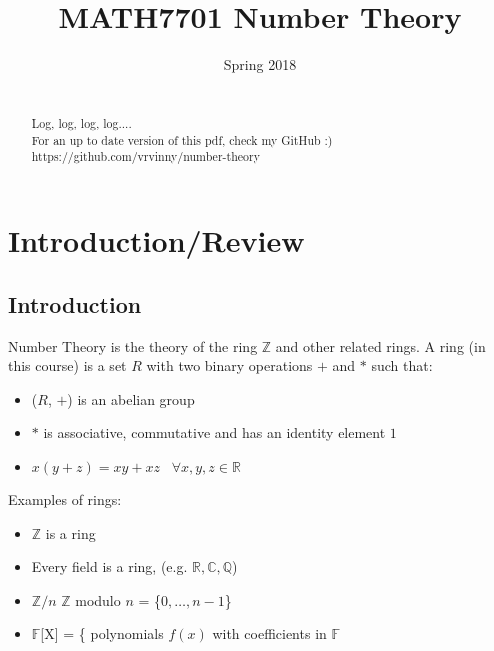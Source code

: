 \documentclass[11pt]{article}
\begin{document}
\newtheorem{theorem}{Theorem}[section]
\newtheorem{definition}[theorem]{Definition}
\newtheorem{proposition}[theorem]{Proposition}
\newtheorem{corollary}[theorem]{Corollary}
\newtheorem{lemma}[theorem]{Lemma}

\title{MATH7701 Number Theory}
	\author{ }
	\date{Spring 2018}
	\maketitle


\newpage
	\begin{abstract}

		\\[1em]
		Log, log, log, log....\\[2em]

		For an up to date version of this pdf, check my GitHub :)\\[0.5em]
https://github.com/vrvinny/number-theory

	\end{abstract}
\newpage
\tableofcontents{}
\newpage
	\section{Introduction/Review}
	\subsection{Introduction}
	Number Theory is the theory of the ring $\mathbb{Z}$ and other related rings. A ring (in this course) is a set $R$ with two binary operations $+$ and $*$ such that:
	\begin{itemize}
		\item ($R$, $+$) is an abelian group
		\item $*$ is associative, commutative and has an identity element $1$
		\item $x(y+z) = xy + xz \hspace{10pt} \forall x,y,z \in \mathbb{R} $

	\end{itemize}
Examples of rings:
	\begin{itemize}
		\item $\mathbb{Z}$ is a ring
		\item Every field is a ring, (e.g. $\mathbb{R}, \mathbb{C}, \mathbb{Q}$)
		\item $\mathbb{Z}/n$ \hspace{10pt} $\mathbb{Z}$ modulo $n$ = \{$0, \dots, n-1$\}
		\item $\mathbb{F}$[X] = \{ polynomials $f(x)$ with coefficients in $\mathbb{F}$


	\end{itemize}
\end{document}
